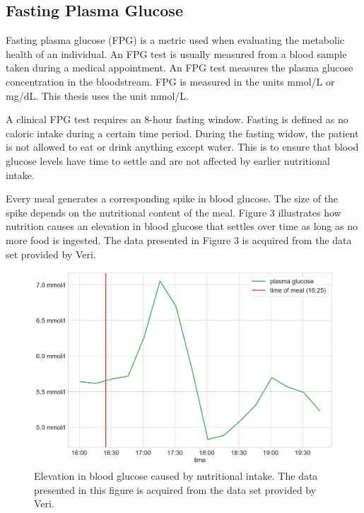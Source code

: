\documentclass[english, 12pt, a4paper, elec, utf8, a-1b, online]{aaltothesis}
\begin{document}
\subsection{Fasting Plasma Glucose}
Fasting plasma glucose (FPG) is a metric used when evaluating the metabolic health of an individual\cite{the_expert_committee_on_the_diagnosis_and_classification_of_diabetes_mellitus_report_1997}\cite{ekoe_screening_2018}. An FPG test is usually 
measured from a blood sample taken during a medical appointment. An FPG test measures the plasma glucose
concentration in the bloodstream. FPG is measured in the units mmol/L or mg/dL. This thesis uses the unit mmol/L.

A clinical FPG test requires an 8-hour fasting window. Fasting is defined as no caloric intake during a certain time 
period\cite{the_expert_committee_on_the_diagnosis_and_classification_of_diabetes_mellitus_report_1997}.
During the fasting widow, the patient is not allowed to eat or drink anything except water. This 
is to ensure that blood glucose levels have time to settle and are not affected by earlier nutritional 
intake. 

Every meal generates a corresponding spike in blood glucose. The size of the spike
depends on the nutritional content of the meal\cite{pi-sunyer_glycemic_2002}. Figure 3 illustrates how nutrition causes an elevation in 
blood glucose that settles over time as long as no more food is ingested. The data presented in Figure 3 is acquired from the data set provided by Veri.

\begin{figure}[H]
\centering
\includegraphics[width=14cm]{images/after_meal_glucose.png}
\caption{Elevation in blood glucose caused by nutritional intake. The data presented in this figure is acquired from the data set provided by Veri.}
\end{figure}
\end{document}
